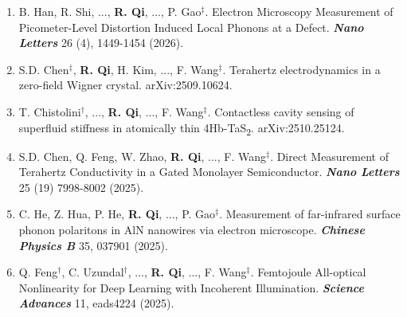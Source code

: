 \documentclass[11pt,sans]{moderncv}
\newcommand{\myemph}[1]{\textbf{\textit{#1}}}
\newcommand{\myname}[1]{\textbf{#1}}
\newcommand{\mylink}[1]{\href{#1}{\color{mycolor}\faLink}}
\begin{document}
\begin{enumerate}[topsep=2pt,itemsep=1ex,partopsep=1ex,parsep=1ex,leftmargin=6.35em,resume]



	\item B. Han, R. Shi, ..., \myname{R. Qi}, ..., P. Gao$^\ddag$.
	Electron Microscopy Measurement of Picometer-Level Distortion Induced Local Phonons at a Defect.
	\myemph{Nano Letters} 26 (4), 1449-1454 (2026).
	\mylink{https://pubs.acs.org/doi/10.1021/acs.nanolett.5c05660}

	\item S.D. Chen$^\ddag$, \myname{R. Qi}, H. Kim, ..., F. Wang$^\ddag$.
	Terahertz electrodynamics in a zero-field Wigner crystal.
	arXiv:2509.10624.
	\mylink{https://arxiv.org/abs/2509.10624}

	\item T. Chistolini$^\dag$, ..., \myname{R. Qi}, ..., F. Wang$^\ddag$.
	Contactless cavity sensing of superfluid stiffness in atomically thin 4Hb-TaS\textsubscript{2}.
	arXiv:2510.25124.
	\mylink{https://arxiv.org/abs/2510.25124}

	\item S.D. Chen, Q. Feng, W. Zhao, \myname{R. Qi}, ..., F. Wang$^\ddag$.
	Direct Measurement of Terahertz Conductivity in a Gated Monolayer Semiconductor.
	\myemph{Nano Letters} 25 (19) 7998-8002 (2025).
	\mylink{https://pubs.acs.org/doi/10.1021/acs.nanolett.5c01605}

	\item C. He, Z. Hua, P. He, \myname{R. Qi}, ..., P. Gao$^\ddag$.
	Measurement of far-infrared surface phonon polaritons in AlN nanowires via electron microscope.
	\myemph{Chinese Physics B} 35, 037901 (2025).
	\mylink{https://iopscience.iop.org/article/10.1088/1674-1056/ae2a00/meta}

	\item Q. Feng$^\dag$, C. Uzundal$^\dag$, ..., \myname{R. Qi}, ..., F. Wang$^\ddag$.
	Femtojoule All-optical Nonlinearity for Deep Learning with Incoherent Illumination.
	\myemph{Science Advances} 11, eads4224 (2025).
	\mylink{https://www.science.org/doi/10.1126/sciadv.ads4224}
	

\end{enumerate}
\end{document}
